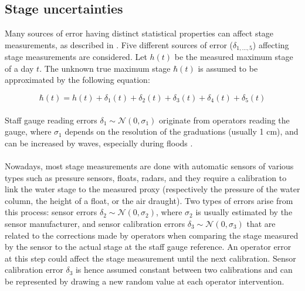 \documentclass[11pt]{article}
\begin{document}
    \subsection{Stage uncertainties}
    \label{subsec:StageErr}
    
    Many sources of error having distinct statistical properties can affect stage measurements, as described in \citet{horner_impact_2018}. Five different sources of error ($\delta_{1,...,5}$) affecting stage measurements are considered. Let $h(t)$ be the measured maximum stage of a day $t$. The unknown true maximum stage $\hbar(t)$ is assumed to be approximated by the following equation:
    
    \begin{equation}
        \hbar(t) = h(t) + \delta_1(t) + \delta_2(t) + \delta_3(t) + \delta_4(t) + \delta_5(t)
        \label{eq:StageError}
    \end{equation}

    \paragraph{}Staff gauge reading errors $\delta_1 \sim \mathcal{N}(0,\sigma_1)$ originate from operators reading the gauge, where $\sigma_1$ depends on the resolution of the graduations (usually 1 cm), and can be increased by waves, especially during floods \citep{mcmillan_benchmarking_2012}.

    \paragraph{}Nowadays, most stage measurements are done with automatic sensors of various types such as pressure sensors, floats, radars, and they require a calibration to link the water stage to the measured proxy (respectively the pressure of the water column, the height of a float, or the air draught). Two types of errors arise from this process: sensor errors $\delta_2 \sim \mathcal{N}(0,\sigma_2)$, where $\sigma_2$ is usually estimated by the sensor manufacturer, and sensor calibration errors $\delta_3 \sim \mathcal{N}(0,\sigma_3)$ that are related to the corrections made by operators when comparing the stage measured by the sensor to the actual stage at the staff gauge reference. An operator error at this step could affect the stage measurement until the next calibration. Sensor calibration error $\delta_3$ is hence assumed constant between two calibrations and can be represented by drawing a new random value at each operator intervention.
    
\end{document}
